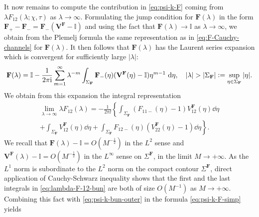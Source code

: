 It now remains to compute the contribution in \eqref{eq:psi-k-F} coming from $\lambda F_{12}(\lambda;\chi,\tau)$ as $\lambda\to\infty$. Formulating the jump condition for $\mathbf{F}(\lambda)$ in the form $\mathbf{F}_+ - \mathbf{F}_- = \mathbf{F}_- (\mathbf{V}^{\mathbf{F}}-\mathbb{I})$ and using the fact that $\mathbf{F}(\lambda)\to\mathbb{I}$ as $\lambda\to\infty$, we obtain from the Plemelj formula
the same representation as in \eqref{eq:F-Cauchy-channels} for $\mathbf{F}(\lambda)$. It then follows that
$\mathbf{F}(\lambda)$ has the Laurent series expansion which is convergent for sufficiently large $|\lambda|$:
\begin{equation}
\mathbf{F}(\lambda) = \mathbb{I} - \frac{1}{2\pi \ii} \sum_{m=1}^{\infty} \lambda^{-m} \int_{\Sigma_\mathbf{F}} \mathbf{F}_-(\eta)(\mathbf{V}^{\mathbf{F}}(\eta)-\mathbb{I}) \eta^{m-1}\, \dd \eta,\quad |\lambda|>|\Sigma_\mathbf{F}|\defeq \sup_{\eta\in\Sigma_\mathbf{F}}|\eta|.
\label{eq:F-Laurent-bun}
\end{equation}
We obtain from this expansion the integral representation 
\begin{multline}
\lim_{\lambda\to\infty} \lambda F_{12}(\lambda) =
-\frac{1}{2\pi \ii} \left \lbrace \int_{\Sigma_\mathbf{F}} ( F_{11-}(\eta) - 1)V^{\mathbf{F}}_{12}(\eta)\dd \eta\right. \\
\left. +\int_{\Sigma_\mathbf{F}} V^{\mathbf{F}}_{12}(\eta)\dd \eta
+ \int_{\Sigma_\mathbf{F}} F_{12-}(\eta)(V^{\mathbf{F}}_{22}(\eta) -1 ) \dd \eta
 \right\rbrace.
 \label{eq:lambda-F-12-bun}
\end{multline}
We recall that $\mathbf{F}(\lambda)-\mathbb{I} = O(M^{-\frac{1}{2}})$ in the $L^2$ sense and $\mathbf{V}^{\mathbf{F}}(\lambda)-\mathbb{I} = O(M^{-\frac{1}{2}})$ in the $L^\infty$ sense on $\Sigma^{\mathbf{F}}$, in the limit $M\to+\infty$. As the $L^1$ norm is subordinate to the $L^2$ norm on the compact contour $\Sigma^\mathbf{F}$, direct application of Cauchy-Schwarz inequality shows that the first and the last integrals in \eqref{eq:lambda-F-12-bun} are both of size $O(M^{-1})$ as $M\to+\infty$. Combining this fact with \eqref{eq:psi-k-bun-outer} in the formula \eqref{eq:psi-k-F-simp} yields
